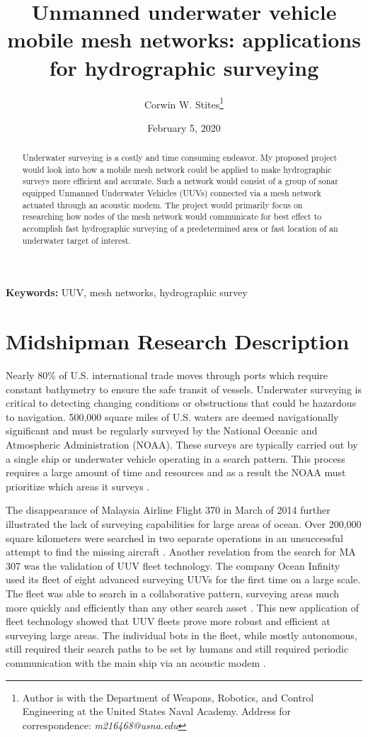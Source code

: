 \documentclass[10pt]{article}
\title{Unmanned underwater vehicle mobile mesh networks: applications for hydrographic surveying}
\author{Corwin W. Stites\thanks{Author is with the Department of Weapons, Robotics, and Control Engineering at the United States Naval Academy. Address for correspondence: \emph{m216468@usna.edu}}}
\date{February 5, 2020}
\begin{document}
\maketitle

\begin{abstract}
	Underwater surveying is a costly and time consuming endeavor. My proposed project would look into how a mobile mesh network could be applied to make hydrographic surveys more efficient and accurate. Such a network would consist of a group of sonar equipped Unmanned Underwater Vehicles (UUVs) connected via a mesh network actuated through an acoustic modem. The project would primarily focus on researching how nodes of the mesh network would communicate for best effect to accomplish fast hydrographic surveying of a predetermined area or fast location of an underwater target of interest. 
\end{abstract}
{\scriptsize\textbf{Keywords: } UUV, mesh networks, hydrographic survey}

\section{Midshipman Research Description}
Nearly 80\% of U.S. international trade moves through ports which require constant bathymetry to ensure the safe transit of vessels. Underwater surveying is critical to detecting changing conditions or obstructions that could be hazardous to navigation. 500,000 square miles of U.S. waters are deemed navigationally significant and must be regularly surveyed by the National Oceanic and Atmospheric Administration (NOAA). These surveys are typically carried out by a single ship or underwater vehicle operating in a search pattern. This process requires a large amount of time and resources and as a result the NOAA must prioritize which areas it surveys \cite{noaa2009hydrographic}.
	
The disappearance of Malaysia Airline Flight 370 in March of 2014 further illustrated the lack of surveying capabilities for large areas of ocean. Over 200,000 square kilometers were searched in two separate operations in an unsuccessful attempt to find the missing aircraft \cite{australia2018joint}. Another revelation from the search for MA 307 was the validation of UUV fleet technology. The company Ocean Infinity used its fleet of eight advanced surveying UUVs for the first time on a large scale. The fleet was able to search in a collaborative pattern, surveying areas much more quickly and efficiently than any other search asset \cite{economist2018fantastical}. This new application of fleet technology showed that UUV fleets prove more robust and efficient at surveying large areas. The individual bots in the fleet, while mostly autonomous, still required their search paths to be set by humans and still required periodic communication with the main ship via an acoustic modem \cite{haun2017ocean}. 	
\end{document}
